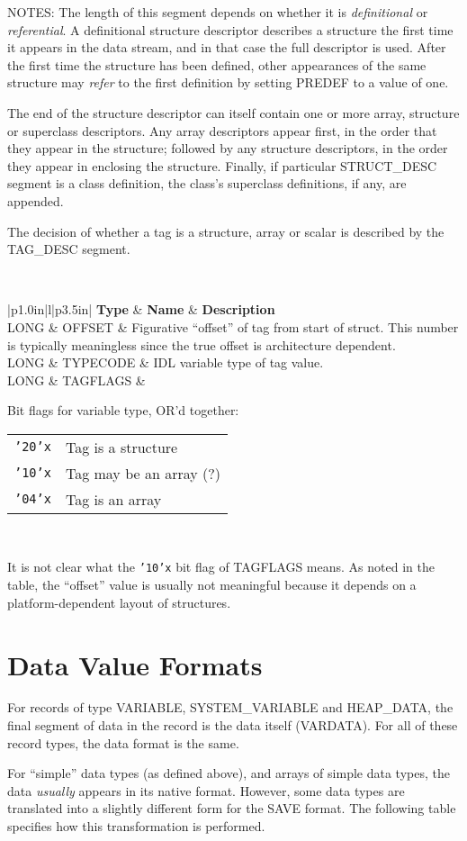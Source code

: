 \documentclass[12pt]{article}
\def\recb#1#2{\bigskip\begin{center}\par\noindent{Format: \bf #1}\qquad{\tt #2}\nopagebreak\\[0.05in]\nopagebreak
\begin{tabular}{|p{1.0in}|l|p{3.5in}|}\hline
{\bf Type} & {\bf Name} & {\bf Description}\\\hline}
\def\rece{\end{tabular}\end{center}\medskip}
\def\recl#1#2#3{{#2} & {#1} & {#3}\\\hline}
\begin{document}
NOTES: The length of this segment depends on whether it is {\it
definitional\/} or {\it referential}.  A definitional structure
descriptor describes a structure the first time it appears in the data
stream, and in that case the full descriptor is used.  After the first
time the structure has been defined, other appearances of the same
structure may {\it refer\/} to the first definition by setting PREDEF
to a value of one.

The end of the structure descriptor can itself contain one or more
array, structure or superclass descriptors.  Any array descriptors
appear first, in the order that they appear in the structure; followed
by any structure descriptors, in the order they appear in enclosing
the structure.  Finally, if particular STRUCT\_DESC segment is a class
definition, the class's superclass definitions, if any, are appended.

The decision of whether a tag is a structure, array or scalar is
described by the TAG\_DESC segment.

\recb{TAG\_DESC}{Descriptor of a structure tag}
\recl{OFFSET}{LONG}{Figurative ``offset'' of tag from start of struct.
                    This number is typically meaningless since the true 
                    offset is architecture dependent.}
\recl{TYPECODE}{LONG}{IDL variable type of tag value.}
\recl{TAGFLAGS}{LONG}{Bit flags for variable type, OR'd together:
\begin{tabular}{ll}
{\tt '20'x} & Tag is a structure\\
{\tt '10'x} & Tag may be an array (?)\\
{\tt '04'x} & Tag is an array\\
\end{tabular}}
\rece

It is not clear what the {\tt '10'x} bit flag of TAGFLAGS means.  As
noted in the table, the ``offset'' value is usually not meaningful
because it depends on a platform-dependent layout of structures.

\section{Data Value Formats\label{s:dvalue}}

For records of type VARIABLE, SYSTEM\_VARIABLE and HEAP\_DATA, the
final segment of data in the record is the data itself (VARDATA).  For
all of these record types, the data format is the same.

For ``simple'' data types (as defined above), and arrays of simple
data types, the data {\it usually\/} appears in its native format.
However, some data types are translated into a slightly different form
for the SAVE format.  The following table specifies how this
transformation is performed.
\end{document}
